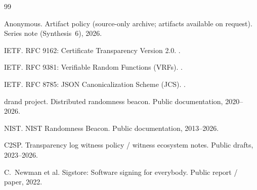 \documentclass[11pt]{article}
\begin{document}
\begin{thebibliography}{99}\small

Anonymous.
\newblock Artifact policy (source-only archive; artifacts available on request).
\newblock Series note (Synthesis~6), 2026.

IETF.
\newblock RFC 9162: Certificate Transparency Version 2.0.
.

IETF.
\newblock RFC 9381: Verifiable Random Functions (VRFs).
.

IETF.
\newblock RFC 8785: JSON Canonicalization Scheme (JCS).
.

drand project.
\newblock Distributed randomness beacon.
\newblock Public documentation, 2020--2026.

NIST.
\newblock NIST Randomness Beacon.
\newblock Public documentation, 2013--2026.

C2SP.
\newblock Transparency log witness policy / witness ecosystem notes.
\newblock Public drafts, 2023--2026.

C.~Newman et al.
\newblock Sigstore: Software signing for everybody.
\newblock Public report / paper, 2022.

\end{thebibliography}
\end{document}

